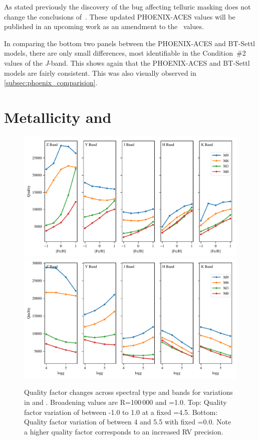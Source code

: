 As stated previously the discovery of the bug affecting telluric masking does not change the conclusions of~\citet{figueira_radial_2016}.
These updated {PHOENIX-ACES} values will be published in an upcoming work as an amendment to the~\citet{figueira_radial_2016} values.

In comparing the bottom two panels between the {PHOENIX-ACES} and {BT-Settl} models, there are only small differences, most identifiable in the Condition~\#2 values of the \emph{J}-band.
This shows again that the {PHOENIX-ACES} and {BT-Settl} models are fairly consistent.
This was also visually observed in \cref{subsec:phoenix_comparision}.


\section{Metallicity and \texorpdfstring{\Logg{}}{Logg}}
\label{sec:metallicity_logg}
\begin{figure}
    \includegraphics[width=0.95\linewidth]{figures/information-content/metalicity_effect.pdf}\\
    \includegraphics[width=0.95\linewidth]{figures/information-content/logg_effect.pdf}
    \caption[Quality factor verse \feh{} and \Logg{} for different spectral types and wavelength bands.]{Quality factor changes across spectral type and bands for variations in \feh{} and \Logg{}.
        Broadening values are R=100\,000 and \Vsini{}=1.0\kmps{}.
        Top: Quality factor variation of \feh{} between -1.0 to 1.0 at a fixed \Logg{}=4.5.
        Bottom: Quality factor variation of \Logg{} between 4 and 5.5 with fixed \feh{}=0.0.
        Note a higher quality factor corresponds to an increased {RV} precision.}
    \label{fig:logg_metalicity_deviations}
\end{figure}

